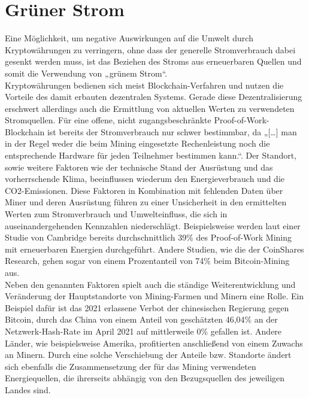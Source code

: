\documentclass[12pt]{article}
\begin{document}
\section{Grüner Strom}
Eine Möglichkeit, um negative Auswirkungen auf die Umwelt durch Kryptowährungen zu verringern, ohne dass der generelle Stromverbrauch dabei gesenkt werden muss, ist das Beziehen des Stroms aus erneuerbaren Quellen und somit die Verwendung von „grünem Strom“.\\
Kryptowährungen bedienen sich meist Blockchain-Verfahren und nutzen die Vorteile des damit erbauten dezentralen Systems. Gerade diese Dezentralisierung erschwert allerdings auch die Ermittlung von aktuellen Werten zu verwendeten Stromquellen. Für eine offene, nicht zugangsbeschränkte Proof-of-Work-Blockchain ist bereits der Stromverbrauch nur schwer bestimmbar, da „[…] man in der Regel weder die beim Mining eingesetzte Rechenleistung noch die entsprechende Hardware für jeden Teilnehmer bestimmen kann.“. Der Standort, sowie weitere Faktoren wie der technische Stand der Ausrüstung und das vorherrschende Klima, beeinflussen wiederum den Energieverbrauch und die CO2-Emissionen. Diese Faktoren in Kombination mit fehlenden Daten über Miner und deren Ausrüstung führen zu einer Unsicherheit in den ermittelten Werten zum Stromverbrauch und Umwelteinfluss, die sich in auseinandergehenden Kennzahlen niederschlägt. Beispielsweise werden laut einer Studie von Cambridge bereits durchschnittlich 39\% des Proof-of-Work Mining mit erneuerbaren Energien durchgeführt. Andere Studien, wie die der CoinShares Research, gehen sogar von einem Prozentanteil von 74\% beim Bitcoin-Mining aus.\\
Neben den genannten Faktoren spielt auch die ständige Weiterentwicklung und Veränderung der Hauptstandorte von Mining-Farmen und Minern eine Rolle. Ein Beispiel dafür ist das 2021 erlassene Verbot der chinesischen Regierung gegen Bitcoin, durch das China von einem Anteil von geschätzten 46,04\% an der Netzwerk-Hash-Rate im April 2021 auf mittlerweile 0\% gefallen ist. Andere Länder, wie beispielsweise Amerika, profitierten anschließend von einem Zuwachs an Minern. Durch eine solche Verschiebung der Anteile bzw. Standorte ändert sich ebenfalls die Zusammensetzung der für das Mining verwendeten Energiequellen, die ihrerseits abhängig von den Bezugsquellen des jeweiligen Landes sind.\\
\end{document}
